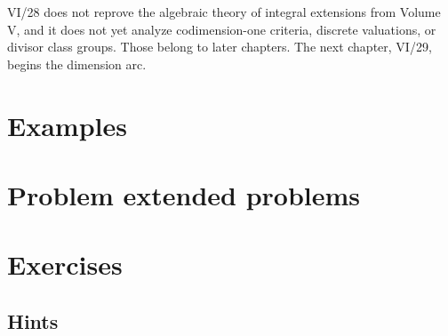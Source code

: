 VI/28 does not reprove the algebraic theory of integral extensions from Volume V, and it does not yet analyze
codimension-one criteria, discrete valuations, or divisor class groups.  Those belong to later chapters.  The
next chapter, VI/29, begins the dimension arc.

\section{Examples}



\section{Problem extended problems}





















\section{Exercises}


\ifdefined\IncludeExerciseHints
\subsection*{Hints}

\fi

\ifdefined\IncludeExerciseSolutions
